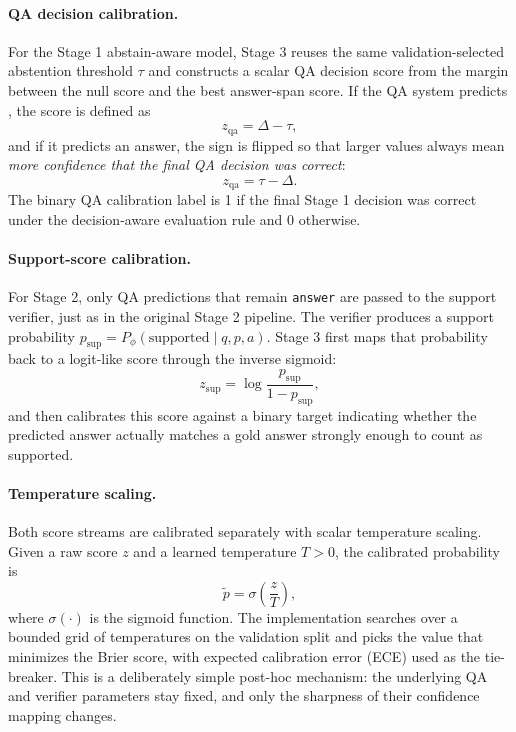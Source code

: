 \paragraph{QA decision calibration.}
For the Stage 1 abstain-aware model, Stage 3 reuses the same
validation-selected abstention threshold \(\tau\) and constructs a scalar QA
decision score from the margin between the null score and the best answer-span
score.
If the QA system predicts \abstain, the score is defined as
\begin{equation}
  z_{\mathrm{qa}}
  =
  \Delta - \tau,
\end{equation}
and if it predicts an answer, the sign is flipped so that larger values always
mean \emph{more confidence that the final QA decision was correct}:
\begin{equation}
  z_{\mathrm{qa}}
  =
  \tau - \Delta.
\end{equation}
The binary QA calibration label is 1 if the final Stage 1 decision was correct
under the decision-aware evaluation rule and 0 otherwise.

\paragraph{Support-score calibration.}
For Stage 2, only QA predictions that remain \texttt{answer} are passed to the
support verifier, just as in the original Stage 2 pipeline.
The verifier produces a support probability
\(
  p_{\mathrm{sup}} = P_{\phi}(\text{supported} \mid q,p,a)
\).
Stage 3 first maps that probability back to a logit-like score through the
inverse sigmoid:
\begin{equation}
  z_{\mathrm{sup}}
  =
  \log\frac{p_{\mathrm{sup}}}{1 - p_{\mathrm{sup}}},
\end{equation}
and then calibrates this score against a binary target indicating whether the
predicted answer actually matches a gold answer strongly enough to count as
supported.

\paragraph{Temperature scaling.}
Both score streams are calibrated separately with scalar temperature scaling.
Given a raw score \(z\) and a learned temperature \(T > 0\), the calibrated
probability is
\begin{equation}
  \tilde{p}
  =
  \sigma\!\left(\frac{z}{T}\right),
\end{equation}
where \(\sigma(\cdot)\) is the sigmoid function.
The implementation searches over a bounded grid of temperatures on the
validation split and picks the value that minimizes the Brier score, with
expected calibration error (ECE) used as the tie-breaker.
This is a deliberately simple post-hoc mechanism:
the underlying QA and verifier parameters stay fixed, and only the sharpness of
their confidence mapping changes.

